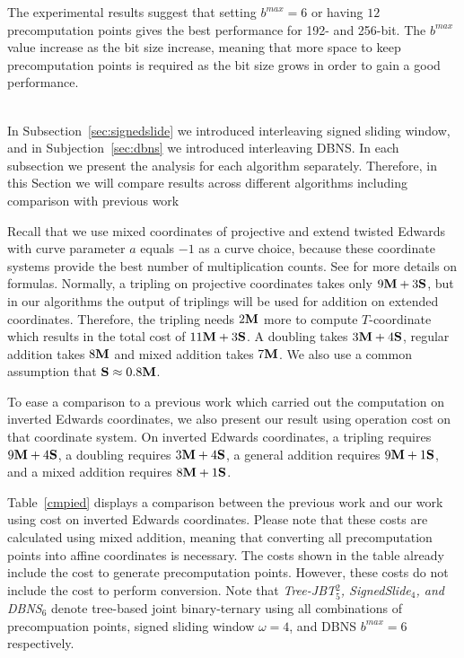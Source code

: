 The experimental results suggest that setting $b^{max} = 6$ or having $12$ precomputation points gives the best performance for 192- and 256-bit.
The $b^{max}$ value increase as the bit size increase, meaning that more space to keep precomputation points is required as the bit size grows
in order to gain a good performance.



 \\

In Subsection~\ref{sec:signedslide} we introduced interleaving signed sliding window,
and in Subjection~\ref{sec:dbns} we introduced interleaving DBNS.
In each subsection we present the analysis for each algorithm separately.
Therefore, in this Section we will compare results across different algorithms including comparison with previous work

Recall that we use mixed coordinates of projective and extend twisted Edwards with curve parameter $a$ equals $-1$ as a curve choice,
because these coordinate systems provide the best number of multiplication counts.
See \cite{EFD} for more details on formulas.
Normally, a tripling on projective coordinates takes only $9\text{\bf M} + 3\text{\bf S}$,
but in our algorithms the output of triplings will be used for addition on extended coordinates.
Therefore, the tripling needs $2\text{\bf M}$ more to compute $T$-coordinate which results in the total cost of $11\text{\bf M} + 3\text{\bf S}$.
A doubling takes $3\text{\bf M} + 4\text{\bf S}$, regular addition takes $8\text{\bf M}$ and mixed addition takes $7\text{\bf M}$.
We also use a common assumption that $\text{\bf S} \approx 0.8\text{\bf M}$.

To ease a comparison to a previous work \cite{DKS09} which carried out the computation on inverted Edwards coordinates,
we also present our result using operation cost on that coordinate system.
On inverted Edwards coordinates, a tripling requires $9\text{\bf M} + 4\text{\bf S}$, a doubling requires $3\text{\bf M} + 4\text{\bf S}$, a general addition requires $9\text{\bf M} + 1\text{\bf S}$,
and a mixed addition requires $8\text{\bf M} + 1\text{\bf S}$.

Table~\ref{cmpied} displays a comparison between the previous work\cite{DKS09} and our work using cost on inverted Edwards coordinates.
Please note that these costs are calculated using mixed addition, meaning that converting all precomputation points into affine coordinates is necessary.
The costs shown in the table already include the cost to generate precomputation points.
However, these costs do not include the cost to perform conversion.
Note that {\it{Tree-JBT$_5^2$, SignedSlide$_4$, and DBNS$_6$}} denote tree-based joint binary-ternary using all combinations of precompuation points,
signed sliding window $\omega = 4$, and DBNS $b^{max} = 6$ respectively.

